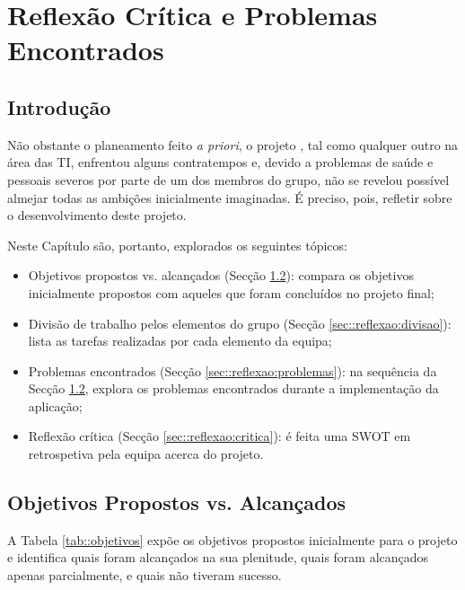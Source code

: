\chapter{Reflexão Crítica e Problemas Encontrados}
\label{ch::reflexao}

\section{Introdução}
\label{sec::reflexao:intro}

Não obstante o planeamento feito \textit{a priori}, o projeto \theapp, tal como qualquer outro na área das \ac{TI}, enfrentou alguns contratempos e, devido a problemas de saúde e pessoais severos por parte de um dos membros do grupo, não se revelou possível almejar todas as ambições inicialmente imaginadas. É preciso, pois, refletir sobre o desenvolvimento deste projeto.

Neste Capítulo são, portanto, explorados os seguintes tópicos:

\begin{itemize}
	\item Objetivos propostos vs. alcançados (Secção \ref{sec::reflexao:objetivos}): compara os objetivos inicialmente propostos com aqueles que foram concluídos no projeto final;
	\item Divisão de trabalho pelos elementos do grupo (Secção \ref{sec::reflexao:divisao}): lista as tarefas realizadas por cada elemento da equipa;
	\item Problemas encontrados (Secção \ref{sec::reflexao:problemas}): na sequência da Secção \ref{sec::reflexao:objetivos}, explora os problemas encontrados durante a implementação da aplicação;
	\item Reflexão crítica (Secção \ref{sec::reflexao:critica}): é feita uma \ac{SWOT} em retrospetiva pela equipa acerca do projeto.
\end{itemize}



\section{Objetivos Propostos vs. Alcançados}
\label{sec::reflexao:objetivos}

A Tabela \ref{tab::objetivos} expõe os objetivos propostos inicialmente para o projeto e identifica quais foram alcançados na sua plenitude, quais foram alcançados apenas parcialmente, e quais não tiveram sucesso.

